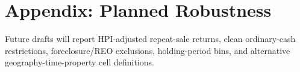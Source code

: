 \appendix

\section{Appendix: Planned Robustness}\label{app:robustness}

Future drafts will report HPI-adjusted repeat-sale returns, clean ordinary-cash restrictions, foreclosure/REO exclusions, holding-period bins, and alternative geography-time-property cell definitions.
